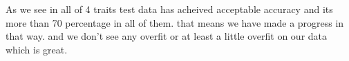 \documentclass[10pt, a4paper]{article}
\begin{document}
\begin{figure}[H]
    \centering
    \hfill %
\end{figure}

As we see in all of 4 traits test data has acheived acceptable accuracy and its more than 70 percentage in all of them. that means we have made a progress in that way. and we don't see any overfit or at least a little overfit on our data which is great.
\end{document}
